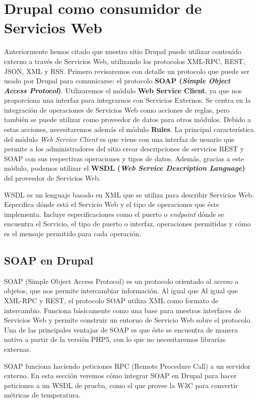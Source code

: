 \chapter{\huge{Drupal como consumidor de Servicios Web}}

Anteriormente hemos citado que nuestro sitio Drupal puede utilizar contenido externo a través de Servicios 
Web, utilizando los protocolos XML-RPC, REST, JSON, XML y RSS. Primero revisaremos con detalle un protocolo 
que puede ser usado por Drupal para comunicarse: el protocolo \textbf{SOAP (\textit{Simple Object Access Protocol})}.
Utilizaremos el módulo \textbf{Web Service Client}, ya que nos proporciona una interfaz para integrarnos 
con Servicios Externos. Se centra en la integración de operaciones de Servicios Web como acciones de reglas, 
pero también se puede utilizar como proveedor de datos para otros módulos. Debido a estas acciones, necesitaremos 
además el módulo \textbf{Rules}. La principal característica del módulo \textit{Web Service Client} es que 
viene con una interfaz de usuario que permite a los administradores del sitio crear descripciones de 
servicios REST y SOAP con sus respectivas operaciones y tipos de datos. Además, gracias a este módulo, 
podemos utilizar el \textbf{WSDL (\textit{Web Service Description Language})} del proveedor de Servicios Web.

WSDL es un lenguaje basado en XML que se utiliza para describir Servicios Web. Especifica dónde está el 
Servicio Web y el tipo de operaciones que éste implementa. Incluye especificaciones como el puerto 
o \textit{endpoint} dónde se encuentra el Servicio, el tipo de puerto o interfaz, operaciones permitidas y 
cómo es el mensaje permitido para cada operación. 

\section{SOAP en Drupal}

SOAP (Simple Object Access Protocol) es un protocolo orientado al acceso a objetos, que nos permite intercambiar 
información. Al igual que Al igual que XML-RPC y REST, el protocolo SOAP utiliza XML como formato de 
intercambio. Funciona básicamente como una base para nuestros interfaces de Servicios Web y permite construir 
un entorno de Servicio Web sobre el protocolo. Una de las principales ventajas de SOAP es que éste se encuentra 
de manera nativa a partir de la versión PHP5, con lo que no necesitaremos librarías externas.

SOAP funciona haciendo peticiones RPC (Remote Procedure Call) a un servidor externo. En esta sección veremos 
cómo integrar SOAP en Drupal para hacer peticiones a un WSDL de prueba, como el que provee la W3C para convertir 
métricas de temperatura.


